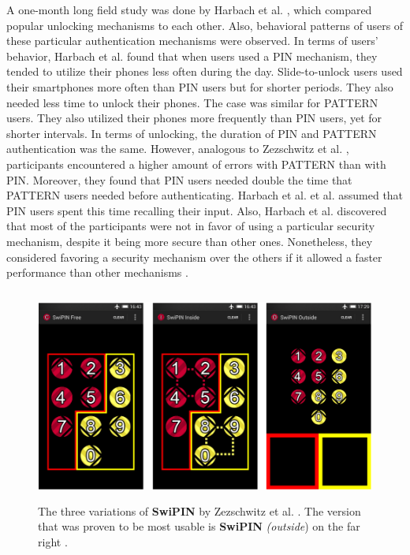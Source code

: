 A one-month long field study was done by Harbach et al. \cite{AnatomySmartphone}, which compared popular unlocking mechanisms to each other. Also, behavioral patterns of users of these particular authentication mechanisms were observed. In terms of users' behavior, Harbach et al. \cite{AnatomySmartphone} found that when users used a PIN mechanism, they tended to utilize their phones less often during the day. Slide-to-unlock users used their smartphones more often than PIN users but for shorter periods. They also needed less time to unlock their phones. The case was similar for PATTERN users. They also utilized their phones more frequently than PIN users, yet for shorter intervals. In terms of unlocking, the duration of PIN and PATTERN authentication was the same. However, analogous to Zezschwitz et al. \cite{PatternWild}, participants encountered a higher amount of errors with PATTERN than with PIN.
Moreover, they found that PIN users needed double the time that PATTERN users needed before authenticating. Harbach et al. et al. \cite{AnatomySmartphone} assumed that PIN users spent this time recalling their input. Also, Harbach et al. \cite{AnatomySmartphone} discovered that most of the participants were not in favor of using a particular security mechanism, despite it being more secure than other ones. Nonetheless, they considered favoring a security mechanism over the others if it allowed a faster performance than other mechanisms \cite{AnatomySmartphone,Albayram:2017:BUL:3235924.3235929}.

\begin{figure}[t!]
\centering
\includegraphics[width=13cm, height=7cm]{Chapters/graphics/swipin.PNG}
\caption{The three variations of \textbf{SwiPIN} by Zezschwitz et al. \cite{Swipin}. The version that was proven to be most usable is \textbf{SwiPIN} \textit{(outside}) on the far right \cite{Swipin}. }
\label{fig:swipin}
\end{figure}


